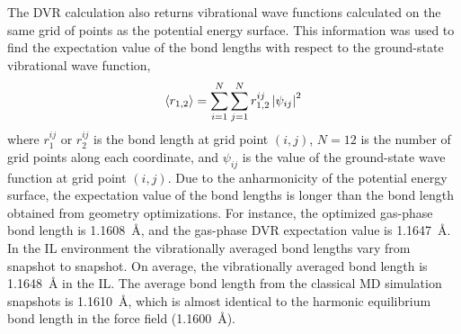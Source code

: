 The DVR calculation also returns vibrational wave functions calculated on the same grid of points as the potential energy surface. This information was used to find the expectation value of the bond lengths with respect to the ground-state vibrational wave function,
\begin{equation}
  \label{paper_02:eq:3}
  \Braket{ r_{1,2} } = \sum_{i = 1}^{N} \sum_{j = 1}^{N} r_{1,2}^{ij}\left| \psi_{ij} \right|^{2}
\end{equation}
where \(r_{1}^{ij}\) or \(r_{2}^{ij}\) is the bond length at grid point \((i,j)\), \(N = 12\) is the number of grid points along each coordinate, and \(\psi_{ij}\) is the value of the ground-state wave function at grid point \((i,j)\). Due to the anharmonicity of the potential energy surface, the expectation value of the bond lengths is longer than the bond length obtained from geometry optimizations. For instance, the optimized gas-phase bond length is \SI{1.1608}{\angstrom}, and the gas-phase DVR expectation value is \SI{1.1647}{\angstrom}. In the IL environment the vibrationally averaged  bond lengths vary from snapshot to snapshot. On average, the vibrationally averaged  bond length is \SI{1.1648}{\angstrom} in the IL. The average bond length from the classical MD simulation snapshots is \SI{1.1610}{\angstrom}, which is almost identical to the harmonic equilibrium bond length in the force field (\SI{1.1600}{\angstrom}).

